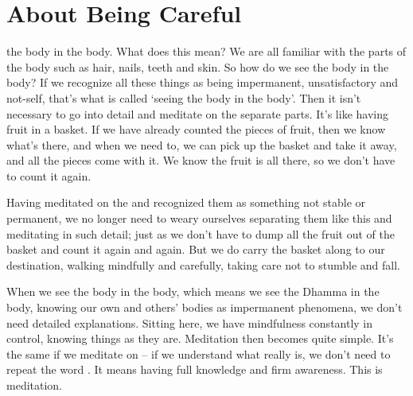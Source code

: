 
\chapter{About Being Careful}

 the body in the body. What does this mean? We are all familiar with the parts of the body such as hair, nails, teeth and skin. So how do we see the body in the body? If we recognize all these things as being impermanent, unsatisfactory and not-self, that's what is called `seeing the body in the body'. Then it isn't necessary to go into detail and meditate on the separate parts. It's like having fruit in a basket. If we have already counted the pieces of fruit, then we know what's there, and when we need to, we can pick up the basket and take it away, and all the pieces come with it. We know the fruit is all there, so we don't have to count it again.

Having meditated on the  and recognized them as something not stable or permanent, we no longer need to weary ourselves separating them like this and meditating in such detail; just as we don't have to dump all the fruit out of the basket and count it again and again. But we do carry the basket along to our destination, walking mindfully and carefully, taking care not to stumble and fall.

When we see the body in the body, which means we see the Dhamma in the body, knowing our own and others' bodies as impermanent phenomena, we don't need detailed explanations. Sitting here, we have mindfulness constantly in control, knowing things as they are. Meditation then becomes quite simple. It's the same if we meditate on  -- if we understand what  really is, we don't need to repeat the word . It means having full knowledge and firm awareness. This is meditation.

